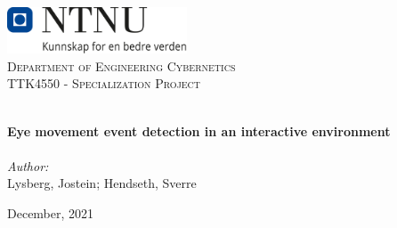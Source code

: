 
\begin{titlepage}
\vbox{ }
\vbox{ }
\begin{center}
\includegraphics[width=0.40\textwidth]{Images/NTNU_logo.png}\\[1cm]
\textsc{\LARGE Department of Engineering Cybernetics}\\[1.5cm]
\textsc{\Large TTK4550 - Specialization Project}\\[0.5cm]
\vbox{ }

\HRule \\[0.4cm]
{ \huge \bfseries Eye movement event detection in an interactive environment}\\[0.4cm]
\HRule \\[1.5cm]

\large
\emph{Author:}\\
Lysberg, Jostein; Hendseth, Sverre
\vfill

{\large December, 2021}
\end{center}
\end{titlepage}